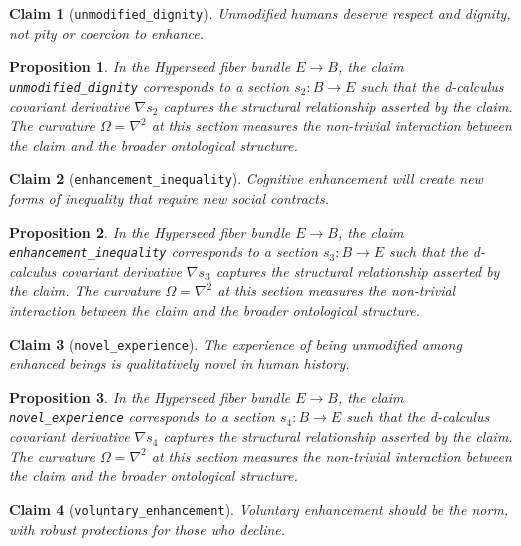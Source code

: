 \documentclass{article}
\newtheorem{claim}{Claim}
\newtheorem{proposition}{Proposition}
\begin{document}
\begin{claim}[\texttt{unmodified_dignity}]
Unmodified humans deserve respect and dignity, not pity or coercion to enhance.
\end{claim}

\begin{proposition}
In the Hyperseed fiber bundle $E \to B$, the claim \texttt{unmodified_dignity} corresponds to a section $s_2: B \to E$ such that the d-calculus covariant derivative $\nabla s_2$ captures the structural relationship asserted by the claim. The curvature $\Omega = \nabla^2$ at this section measures the non-trivial interaction between the claim and the broader ontological structure.
\end{proposition}

\begin{claim}[\texttt{enhancement_inequality}]
Cognitive enhancement will create new forms of inequality that require new social contracts.
\end{claim}

\begin{proposition}
In the Hyperseed fiber bundle $E \to B$, the claim \texttt{enhancement_inequality} corresponds to a section $s_3: B \to E$ such that the d-calculus covariant derivative $\nabla s_3$ captures the structural relationship asserted by the claim. The curvature $\Omega = \nabla^2$ at this section measures the non-trivial interaction between the claim and the broader ontological structure.
\end{proposition}

\begin{claim}[\texttt{novel_experience}]
The experience of being unmodified among enhanced beings is qualitatively novel in human history.
\end{claim}

\begin{proposition}
In the Hyperseed fiber bundle $E \to B$, the claim \texttt{novel_experience} corresponds to a section $s_4: B \to E$ such that the d-calculus covariant derivative $\nabla s_4$ captures the structural relationship asserted by the claim. The curvature $\Omega = \nabla^2$ at this section measures the non-trivial interaction between the claim and the broader ontological structure.
\end{proposition}

\begin{claim}[\texttt{voluntary_enhancement}]
Voluntary enhancement should be the norm, with robust protections for those who decline.
\end{claim}
\end{document}
